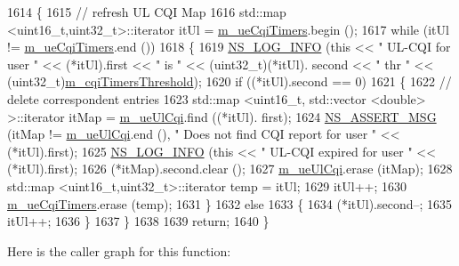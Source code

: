 \begin{DoxyCode}
1614 \{
1615   \textcolor{comment}{// refresh UL CQI  Map}
1616   std::map <uint16\_t,uint32\_t>::iterator itUl = \hyperlink{classns3_1_1MmWaveRrMacScheduler_a48957bee7e937b6d8627194fa429a473}{m\_ueCqiTimers}.begin ();
1617   \textcolor{keywordflow}{while} (itUl != \hyperlink{classns3_1_1MmWaveRrMacScheduler_a48957bee7e937b6d8627194fa429a473}{m\_ueCqiTimers}.end ())
1618     \{
1619       \hyperlink{group__logging_gafbd73ee2cf9f26b319f49086d8e860fb}{NS\_LOG\_INFO} (\textcolor{keyword}{this} << \textcolor{stringliteral}{" UL-CQI for user "} << (*itUl).first << \textcolor{stringliteral}{" is "} << (uint32\_t)(*itUl).
      second << \textcolor{stringliteral}{" thr "} << (uint32\_t)\hyperlink{classns3_1_1MmWaveRrMacScheduler_a21360d09f2e5e4b9fc304752aef8ae6a}{m\_cqiTimersThreshold});
1620       \textcolor{keywordflow}{if} ((*itUl).second == 0)
1621         \{
1622           \textcolor{comment}{// delete correspondent entries}
1623           std::map <uint16\_t, std::vector <double> >::iterator itMap = \hyperlink{classns3_1_1MmWaveRrMacScheduler_aeb890d54a9f369fe677a64efa78d2402}{m\_ueUlCqi}.find ((*itUl).
      first);
1624           \hyperlink{assert_8h_aff5ece9066c74e681e74999856f08539}{NS\_ASSERT\_MSG} (itMap != \hyperlink{classns3_1_1MmWaveRrMacScheduler_aeb890d54a9f369fe677a64efa78d2402}{m\_ueUlCqi}.end (), \textcolor{stringliteral}{" Does not find CQI report for
       user "} << (*itUl).first);
1625           \hyperlink{group__logging_gafbd73ee2cf9f26b319f49086d8e860fb}{NS\_LOG\_INFO} (\textcolor{keyword}{this} << \textcolor{stringliteral}{" UL-CQI expired for user "} << (*itUl).first);
1626           (*itMap).second.clear ();
1627           \hyperlink{classns3_1_1MmWaveRrMacScheduler_aeb890d54a9f369fe677a64efa78d2402}{m\_ueUlCqi}.erase (itMap);
1628           std::map <uint16\_t,uint32\_t>::iterator temp = itUl;
1629           itUl++;
1630           \hyperlink{classns3_1_1MmWaveRrMacScheduler_a48957bee7e937b6d8627194fa429a473}{m\_ueCqiTimers}.erase (temp);
1631         \}
1632       \textcolor{keywordflow}{else}
1633         \{
1634           (*itUl).second--;
1635           itUl++;
1636         \}
1637     \}
1638 
1639   \textcolor{keywordflow}{return};
1640 \}
\end{DoxyCode}


Here is the caller graph for this function\+:



